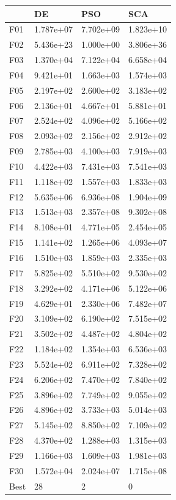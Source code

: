 \begin{tabular}{llll}
\toprule
{} &         DE &        PSO &        SCA \\
\midrule
F01  &  1.787e+07 &  7.702e+09 &  1.823e+10 \\
F02  &  5.436e+23 &  1.000e+00 &  3.806e+36 \\
F03  &  1.370e+04 &  7.122e+04 &  6.658e+04 \\
F04  &  9.421e+01 &  1.663e+03 &  1.574e+03 \\
F05  &  2.197e+02 &  2.600e+02 &  3.183e+02 \\
F06  &  2.136e+01 &  4.667e+01 &  5.881e+01 \\
F07  &  2.524e+02 &  4.096e+02 &  5.166e+02 \\
F08  &  2.093e+02 &  2.156e+02 &  2.912e+02 \\
F09  &  2.785e+03 &  4.100e+03 &  7.919e+03 \\
F10  &  4.422e+03 &  7.431e+03 &  7.541e+03 \\
F11  &  1.118e+02 &  1.557e+03 &  1.833e+03 \\
F12  &  5.635e+06 &  6.936e+08 &  1.904e+09 \\
F13  &  1.513e+03 &  2.357e+08 &  9.302e+08 \\
F14  &  8.108e+01 &  4.771e+05 &  2.454e+05 \\
F15  &  1.141e+02 &  1.265e+06 &  4.093e+07 \\
F16  &  1.510e+03 &  1.859e+03 &  2.335e+03 \\
F17  &  5.825e+02 &  5.510e+02 &  9.530e+02 \\
F18  &  3.292e+02 &  4.171e+06 &  5.122e+06 \\
F19  &  4.629e+01 &  2.330e+06 &  7.482e+07 \\
F20  &  3.109e+02 &  6.190e+02 &  7.515e+02 \\
F21  &  3.502e+02 &  4.487e+02 &  4.804e+02 \\
F22  &  1.184e+02 &  1.354e+03 &  6.536e+03 \\
F23  &  5.524e+02 &  6.911e+02 &  7.328e+02 \\
F24  &  6.206e+02 &  7.470e+02 &  7.840e+02 \\
F25  &  3.896e+02 &  7.749e+02 &  9.055e+02 \\
F26  &  4.896e+02 &  3.733e+03 &  5.014e+03 \\
F27  &  5.145e+02 &  8.850e+02 &  7.109e+02 \\
F28  &  4.370e+02 &  1.288e+03 &  1.315e+03 \\
F29  &  1.166e+03 &  1.609e+03 &  1.981e+03 \\
F30  &  1.572e+04 &  2.024e+07 &  1.715e+08 \\
Best &         28 &          2 &          0 \\
\bottomrule
\end{tabular}

